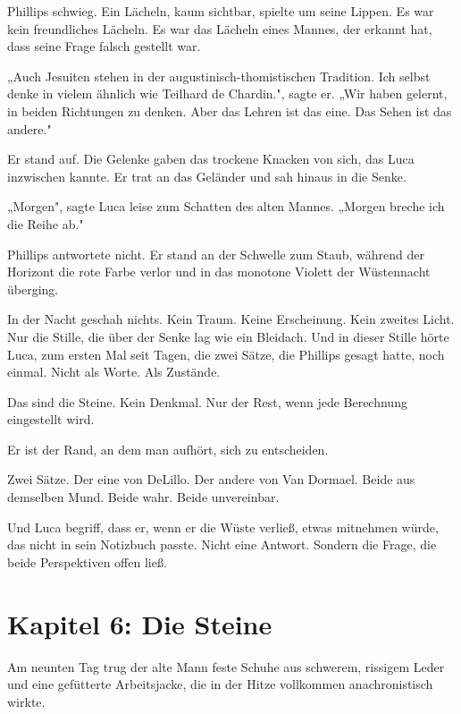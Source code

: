 \documentclass[
  ngerman,
]{article}
\begin{document}
Phillips schwieg. Ein Lächeln, kaum sichtbar, spielte um seine Lippen.
Es war kein freundliches Lächeln. Es war das Lächeln eines Mannes, der
erkannt hat, dass seine Frage falsch gestellt war.

„Auch Jesuiten stehen in der augustinisch-thomistischen Tradition. Ich
selbst denke in vielem ähnlich wie Teilhard de Chardin.", sagte er. „Wir
haben gelernt, in beiden Richtungen zu denken. Aber das Lehren ist das
eine. Das Sehen ist das andere."

Er stand auf. Die Gelenke gaben das trockene Knacken von sich, das Luca
inzwischen kannte. Er trat an das Geländer und sah hinaus in die Senke.

„Morgen", sagte Luca leise zum Schatten des alten Mannes. „Morgen breche
ich die Reihe ab."

Phillips antwortete nicht. Er stand an der Schwelle zum Staub, während
der Horizont die rote Farbe verlor und in das monotone Violett der
Wüstennacht überging.

In der Nacht geschah nichts. Kein Traum. Keine Erscheinung. Kein zweites
Licht. Nur die Stille, die über der Senke lag wie ein Bleidach. Und in
dieser Stille hörte Luca, zum ersten Mal seit Tagen, die zwei Sätze, die
Phillips gesagt hatte, noch einmal. Nicht als Worte. Als Zustände.

Das sind die Steine. Kein Denkmal. Nur der Rest, wenn jede Berechnung
eingestellt wird.

Er ist der Rand, an dem man aufhört, sich zu entscheiden.

Zwei Sätze. Der eine von DeLillo. Der andere von Van Dormael. Beide aus
demselben Mund. Beide wahr. Beide unvereinbar.

Und Luca begriff, dass er, wenn er die Wüste verließ, etwas mitnehmen
würde, das nicht in sein Notizbuch passte. Nicht eine Antwort. Sondern
die Frage, die beide Perspektiven offen ließ.

\section{}\label{section-1}

\section{\texorpdfstring{\textbf{Kapitel 6: Die
Steine}}{Kapitel 6: Die Steine}}\label{kapitel-6-die-steine}

Am neunten Tag trug der alte Mann feste Schuhe aus schwerem, rissigem
Leder und eine gefütterte Arbeitsjacke, die in der Hitze vollkommen
anachronistisch wirkte.
\end{document}
